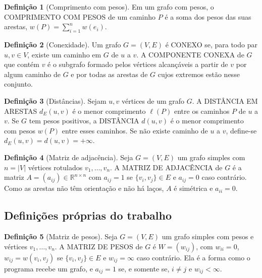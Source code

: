 \documentclass{article}
\theoremstyle{definition}
\newtheorem{definicao}{Definição}[section]
\theoremstyle{plain}
\newcommand{\dE}{d_E}
\begin{document}
\begin{definicao}[Comprimento com pesos]\label{def:compesos}
Em um grafo com pesos, o COMPRIMENTO COM PESOS de um caminho $P$ é a soma dos
pesos das suas arestas, $w(P) = \sum_{i=1}^{n} w(e_i)$.
\end{definicao}

\begin{definicao}[Conexidade]\label{def:conexo}
Um grafo $G=(V,E)$ é CONEXO se, para todo par $u, v \in V$, existe um caminho em
$G$ de $u$ a $v$. A COMPONENTE CONEXA de $G$ que contém $v$ é o subgrafo formado
pelos vértices alcançáveis a partir de $v$ por algum caminho de $G$ e por todas
as arestas de $G$ cujos extremos estão nesse conjunto.
\end{definicao}

\begin{definicao}[Distâncias]\label{def:distancia}
Sejam $u, v$ vértices de um grafo $G$. A DISTÂNCIA EM ARESTAS $\dE(u,v)$ é o menor
comprimento $\ell(P)$ entre os caminhos $P$ de $u$ a $v$. Se $G$ tem pesos
positivos, a DISTÂNCIA $d(u,v)$ é o menor comprimento com pesos $w(P)$ entre esses
caminhos. Se não existe caminho de $u$ a $v$, define-se
$\dE(u,v) = d(u,v) = +\infty$.
\end{definicao}

\begin{definicao}[Matriz de adjacência]\label{def:adjacencia}
Seja $G=(V,E)$ um grafo simples com $n = |V|$ vértices rotulados
$v_1, \dots, v_n$. A MATRIZ DE ADJACÊNCIA de $G$ é a matriz
$A = (a_{ij}) \in \mathbb{R}^{n\times n}$ com $a_{ij} = 1$ se
$\{v_i, v_j\} \in E$ e $a_{ij} = 0$ caso contrário. Como as arestas não têm
orientação e não há laços, $A$ é simétrica e $a_{ii} = 0$.
\end{definicao}

\subsection{Definições próprias do trabalho}

\begin{definicao}[Matriz de pesos]\label{def:matrizpesos}
Seja $G=(V,E)$ um grafo simples com pesos e vértices $v_1, \dots, v_n$. A MATRIZ
DE PESOS de $G$ é $W = (w_{ij})$, com $w_{ii} = 0$, $w_{ij} = w(v_i, v_j)$ se
$\{v_i, v_j\} \in E$ e $w_{ij} = \infty$ caso contrário. Ela é a forma como o
programa recebe um grafo, e $a_{ij} = 1$ se, e somente se, $i \ne j$ e
$w_{ij} < \infty$.
\end{definicao}
\end{document}
